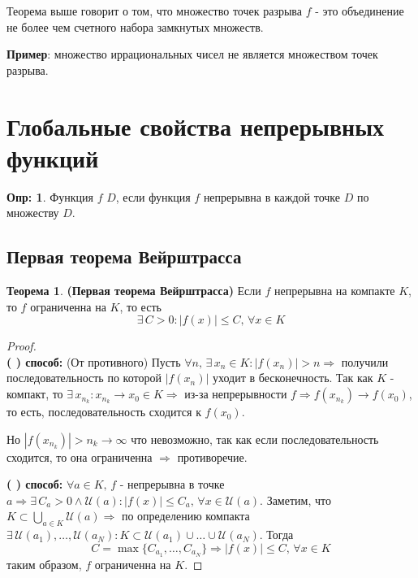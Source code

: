 \documentclass[12pt]{article}
\newcommand{\RN}[1]{%
	\textup{\uppercase\expandafter{\romannumeral#1}}%
}
\theoremstyle{definition}
\newtheorem{defn}{Опр:}
\newtheorem{theorem}{Теорема}
\begin{document}
Теорема выше говорит о том, что множество точек разрыва $f$ - это объединение не более чем счетного набора замкнутых множеств.

\textbf{Пример}: множество иррациональных чисел не является множеством точек разрыва.

\newpage

\section*{Глобальные свойства непрерывных функций}

\begin{defn}
	Функция $f$  $D$, если функция $f$ непрерывна в каждой точке $D$ по множеству $D$.
\end{defn}

\subsection*{Первая теорема Вейрштрасса}
	
\begin{theorem}\textbf{(Первая теорема Вейрштрасса)}
	Если $f$ непрерывна на компакте $K$, то $f$ ограниченна на $K$, то есть $$\exists \, C > 0 \colon |f(x)| \leq C, \, \forall x \in K$$
\end{theorem}

\begin{proof}\hfill\\
	\textbf{(\RN{1}) способ:} (От противного) Пусть $\forall n, \, \exists \, x_n \in K \colon |f(x_n)| > n \Rightarrow$ получили последовательность по которой $|f(x_n)|$ уходит в бесконечность. Так как $K$ - компакт, то $\exists \, x_{n_k} \colon x_{n_k} \to x_0 \in K \Rightarrow$ из-за непрерывности $f \Rightarrow f(x_{n_k}) \to f(x_0)$, то есть, последовательность сходится к $f(x_0)$. 
	
	Но $|f(x_{n_k})| > n_k \to \infty$ что невозможно, так как если последовательность сходится, то она ограниченна $\Rightarrow$ противоречие.
	
	\textbf{(\RN{2}) способ:} $\forall a \in K, \, f$ - непрерывна в точке $a \Rightarrow \exists \, C_a >0 \wedge \mathcal{U}(a) \colon |f(x)|\leq C_a, \, \forall x \in \mathcal{U}(a)$. Заметим, что $K \subset \bigcup\limits_{a \in K} \mathcal{U}(a) \Rightarrow$ по определению компакта $\exists \, \mathcal{U}(a_1), \dotsc, \mathcal{U}(a_N) \colon K \subset \mathcal{U}(a_1) \cup \dotsc \cup \mathcal{U}(a_N)$. Тогда 
	$$C = \max\{C_{a_1},\dotsc, C_{a_N}\} \Rightarrow |f(x)| \leq C, \, \forall x \in K$$
	таким образом, $f$ ограниченна на $K$.
\end{proof}
\end{document}
